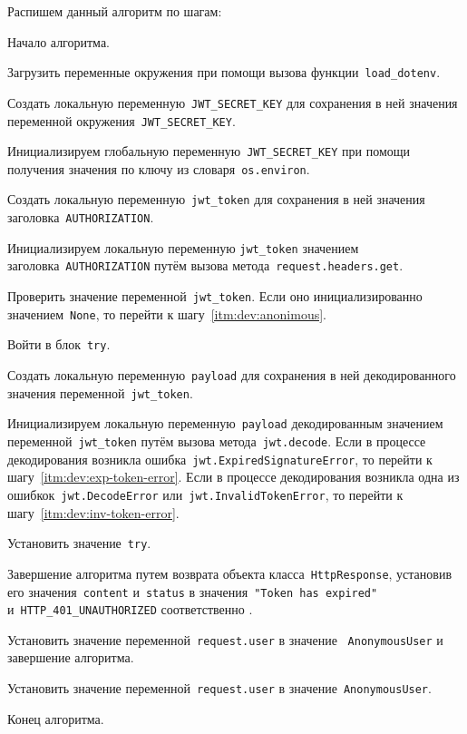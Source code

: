 Распишем данный алгоритм по шагам:
\begin{enumerate_step}
    \item Начало алгоритма.
    \item Загрузить переменные окружения при помощи вызова функции~\lstinline{load_dotenv}.
    \item Создать локальную переменную~\lstinline{JWT_SECRET_KEY} для сохранения в ней значения переменной окружения~\lstinline{JWT_SECRET_KEY}.
    \item Инициализируем глобальную переменную~\lstinline{JWT_SECRET_KEY} при помощи получения значения по ключу из словаря~\lstinline{os.environ}.

    \item Создать локальную переменную~\lstinline{jwt_token} для сохранения в ней значения заголовка~\lstinline{AUTHORIZATION}.
    \item Инициализируем локальную переменную \lstinline{jwt_token} значением заголовка~\lstinline{AUTHORIZATION} путём вызова метода~\lstinline{request.headers.get}.
    \item Проверить значение переменной~\lstinline{jwt_token}.
    Если оно инициализированно значением~\lstinline{None}, то перейти к шагу~\ref{itm:dev:anonimous}.
    \item Войти в блок~\lstinline{try}.
    \item Создать локальную переменную~\lstinline{payload} для сохранения в ней декодированного значения переменной~\lstinline{jwt_token}.
    \item Инициализируем локальную переменную~\lstinline{payload} декодированным значением переменной~\lstinline{jwt_token} путём вызова метода~\lstinline{jwt.decode}.
    Если в процессе декодирования возникла ошибка~\lstinline{jwt.ExpiredSignatureError}, то перейти к шагу~\ref{itm:dev:exp-token-error}.
    Если в процессе декодирования возникла одна из ошибкок~\lstinline{jwt.DecodeError} или~\lstinline{jwt.InvalidTokenError}, то перейти к шагу~\ref{itm:dev:inv-token-error}.
    \item Установить значение~\lstinline{try}.

    \item\label{itm:dev:exp-token-error} Завершение алгоритма путем возврата объекта класса~\lstinline{HttpResponse},
    установив его значения~\lstinline{content} и~\lstinline{status} в значения~\lstinline{"Token has expired"} и~\lstinline{HTTP_401_UNAUTHORIZED} соответственно .

    \item\label{itm:dev:inv-token-error} Установить значение переменной~\lstinline{request.user} в значение ~\lstinline{AnonymousUser} и завершение алгоритма.
    \item\label{itm:dev:anonimous} Установить значение переменной~\lstinline{request.user} в значение~\lstinline{AnonymousUser}.
    \item Конец алгоритма.
\end{enumerate_step}

